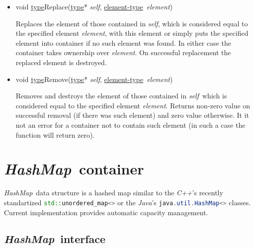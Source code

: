 \documentclass[a4paper]{article}
\newcommand{\Cpp}{\emph{C++}}
\newcommand{\Java}{\emph{Java}}
\newcommand{\st}{\underline{type}}
\newcommand{\et}{\underline{element-type}}
\newcommand{\sv}{\emph{self}}
\newcommand{\ev}{\emph{element}}
\newcommand{\meth}[1]{#1}
\begin{document}
\begin{itemize}
\item \meth{void \st Replace(\st* \sv, \et\ \ev)}


Replaces the element of those contained in \sv, which is considered equal to the specified element \ev, with this element or simply puts the specified element into container if no such element was found.
In either case the container takes ownership over \ev.
On successful replacement the replaced element is destroyed.


\item \meth{void \st Remove(\st* \sv, \et\ \ev)}


Removes and destroys the element of those contained in \sv\ which is considered equal to the specified element \ev.
Returns non-zero value on successful removal (if there was such element) and zero value otherwise.
It it not an error for a container not to contain such element (in such a case the function will return zero).


\end{itemize}




\newcommand{\Hashmap}{\emph{HashMap}}
\section{\Hashmap\ container}


\Hashmap\ data structure is a hashed map similar to the \Cpp's recently standartized \lstinline[language=C++]{std::unordered_map<>} or the \Java's \lstinline[language=Java]{java.util.HashMap<>} classes.
Current implementation provides automatic capacity management.


\subsection{\Hashmap\ interface}
\end{document}
